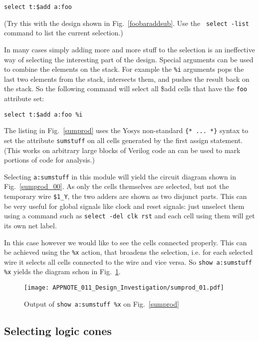 \documentclass[9pt,technote,a4paper]{IEEEtran}
\begin{document}
\begin{verbatim}
select t:$add a:foo
\end{verbatim}

(Try this with the design shown in Fig.~\ref{foobaraddsub}. Use the {\tt
select -list} command to list the current selection.)

In many cases simply adding more and more stuff to the selection is an
ineffective way of selecting the interesting part of the design. Special
arguments can be used to combine the elements on the stack.
For example the {\tt \%i} arguments pops the last two elements from
the stack, intersects them, and pushes the result back on the stack. So the
following command will select all {\$add} cells that have the {\tt foo}
attribute set:

\begin{verbatim}
select t:$add a:foo %i
\end{verbatim}

The listing in Fig.~\ref{sumprod} uses the Yosys non-standard {\tt \{* ... *\}}
syntax to set the attribute {\tt sumstuff} on all cells generated by the first
assign statement. (This works on arbitrary large blocks of Verilog code an
can be used to mark portions of code for analysis.)

Selecting {\tt a:sumstuff} in this module will yield the circuit diagram shown
in Fig.~\ref{sumprod_00}. As only the cells themselves are selected, but not
the temporary wire {\tt \$1\_Y}, the two adders are shown as two disjunct
parts. This can be very useful for global signals like clock and reset signals: just
unselect them using a command such as {\tt select -del clk rst} and each cell
using them will get its own net label.

In this case however we would like to see the cells connected properly. This
can be achieved using the {\tt \%x} action, that broadens the selection, i.e.
for each selected wire it selects all cells connected to the wire and vice
versa. So {\tt show a:sumstuff \%x} yields the diagram schon in Fig.~\ref{sumprod_01}.

\begin{figure}[t]
\texttt{[image: APPNOTE\_011\_Design\_Investigation/sumprod\_01.pdf]}
\caption{Output of {\tt show a:sumstuff \%x} on Fig.~\ref{sumprod}}
\label{sumprod_01}
\end{figure}

\subsection{Selecting logic cones}
\end{document}

